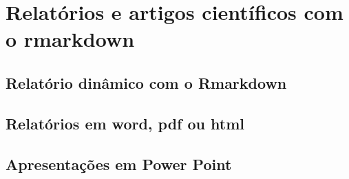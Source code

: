 \documentclass[
]{book}
\begin{document}
\hypertarget{rmd}{%
\chapter{Relatórios e artigos científicos com o rmarkdown}\label{rmd}}

\hypertarget{relatuxf3rio-dinuxe2mico-com-o-rmarkdown}{%
\section{Relatório dinâmico com o Rmarkdown}\label{relatuxf3rio-dinuxe2mico-com-o-rmarkdown}}

\hypertarget{relatuxf3rios-em-word-pdf-ou-html}{%
\section{Relatórios em word, pdf ou html}\label{relatuxf3rios-em-word-pdf-ou-html}}

\hypertarget{apresentauxe7uxf5es-em-power-point}{%
\section{Apresentações em Power Point}\label{apresentauxe7uxf5es-em-power-point}}

  
\end{document}
